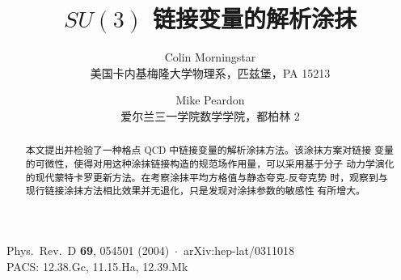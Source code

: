 \documentclass[11pt]{ctexart}
\title{\textbf{$SU(3)$ 链接变量的解析涂抹}}
\author{Colin Morningstar\\[2pt]
        \small 美国卡内基梅隆大学物理系，匹兹堡，PA 15213
        \and Mike Peardon\\[2pt]
        \small 爱尔兰三一学院数学学院，都柏林 2}
\date{}
\begin{document}
\maketitle
\begin{center}\small
Phys.\ Rev.\ D \textbf{69}, 054501 (2004)~$\cdot$~arXiv:hep-lat/0311018\\[2pt]
PACS: 12.38.Gc, 11.15.Ha, 12.39.Mk
\end{center}
\vspace{0.5em}

\begin{abstract}
本文提出并检验了一种格点 QCD 中链接变量的解析涂抹方法。该涂抹方案对链接
变量的可微性，使得对用这种涂抹链接构造的规范场作用量，可以采用基于分子
动力学演化的现代蒙特卡罗更新方法。在考察涂抹平均方格值与静态夸克-反夸克势
时，观察到与现行链接涂抹方法相比效果并无退化，只是发现对涂抹参数的敏感性
有所增大。
\end{abstract}








\end{document}
